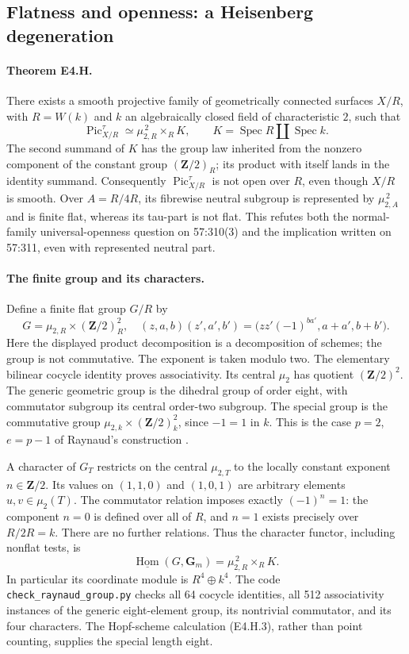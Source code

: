 \subsection{Flatness and openness: a Heisenberg degeneration}

\paragraph{Theorem E4.H.}
There exists a smooth projective family of geometrically connected surfaces
$X/R$, with $R=W(k)$ and $k$ an algebraically closed field of characteristic
$2$, such that
\[
 \operatorname{Pic}^{\tau}_{X/R}
 \simeq\mu_{2,R}^{\,2}\times_R K,
 \qquad K=\operatorname{Spec}R\amalg\operatorname{Spec}k.       \tag{E4.H.1}
\]
The second summand of $K$ has the group law inherited from the nonzero
component of the constant group $(\mathbf Z/2)_R$; its product with itself
lands in the identity summand. Consequently $\operatorname{Pic}^{\tau}_{X/R}$
is not open over $R$, even though $X/R$ is smooth. Over
$A=R/4R$, its fibrewise neutral subgroup is represented by
$\mu_{2,A}^{\,2}$ and is finite flat, whereas its tau-part is not flat.
This refutes both the normal-family universal-openness question on 57:310(3)
and the implication written on 57:311, even with represented neutral part.

\paragraph{The finite group and its characters.}
Define a finite flat group $G/R$ by
\[
 G=\mu_{2,R}\times (\mathbf Z/2)_R^2,
\quad
 (z,a,b)(z',a',b')=
 \bigl(zz'(-1)^{ba'},a+a',b+b'\bigr).                        \tag{E4.H.2}
\]
Here the displayed product decomposition is a decomposition of schemes;
the group is not commutative. The exponent is taken modulo two.
The elementary bilinear cocycle identity proves associativity. Its central
$\mu_2$ has quotient $(\mathbf Z/2)^2$. The generic geometric group is the
dihedral group of order eight, with commutator subgroup its central order-two
subgroup. The special group is the commutative group
$\mu_{2,k}\times(\mathbf Z/2)_k^2$, since $-1=1$ in $k$.
This is the case $p=2$, $e=p-1$ of Raynaud's construction
\cite[Lemma~4.2.1, pp.~135--136]{BCERaynaud1979}.

A character of $G_T$ restricts on the central $\mu_{2,T}$ to the locally
constant exponent $n\in\mathbf Z/2$. Its values on $(1,1,0)$ and
$(1,0,1)$ are arbitrary elements $u,v\in\mu_2(T)$. The commutator relation
imposes exactly $(-1)^n=1$: the component $n=0$ is defined over all of $R$,
and $n=1$ exists precisely over $R/2R=k$. There are no further relations.
Thus the character functor, including nonflat tests, is
\[
 \underline{\operatorname{Hom}}(G,\mathbf G_m)
 =\mu_{2,R}^{\,2}\times_R K.                               \tag{E4.H.3}
\]
In particular its coordinate module is $R^4\oplus k^4$.
The code \texttt{check\_raynaud\_group.py} checks all 64 cocycle identities,
all 512 associativity instances of the generic eight-element group, its
nontrivial commutator, and its four characters. The Hopf-scheme calculation
(E4.H.3), rather than point counting, supplies the special length eight.

